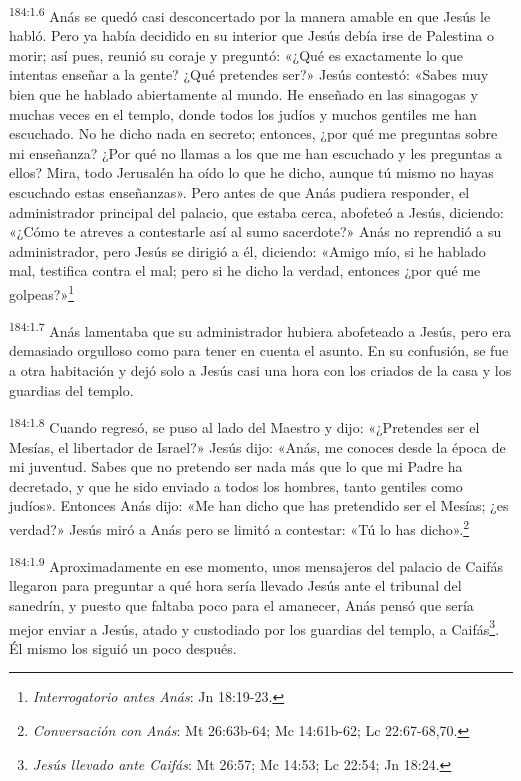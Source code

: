 \par 
\textsuperscript{184:1.6} Anás se quedó casi desconcertado por la manera amable en que Jesús le habló. Pero ya había decidido en su interior que Jesús debía irse de Palestina o morir; así pues, reunió su coraje y preguntó: «¿Qué es exactamente lo que intentas enseñar a la gente? ¿Qué pretendes ser?» Jesús contestó: «Sabes muy bien que he hablado abiertamente al mundo. He enseñado en las sinagogas y muchas veces en el templo, donde todos los judíos y muchos gentiles me han escuchado. No he dicho nada en secreto; entonces, ¿por qué me preguntas sobre mi enseñanza? ¿Por qué no llamas a los que me han escuchado y les preguntas a ellos? Mira, todo Jerusalén ha oído lo que he dicho, aunque tú mismo no hayas escuchado estas enseñanzas». Pero antes de que Anás pudiera responder, el administrador principal del palacio, que estaba cerca, abofeteó a Jesús, diciendo: «¿Cómo te atreves a contestarle así al sumo sacerdote?» Anás no reprendió a su administrador, pero Jesús se dirigió a él, diciendo: «Amigo mío, si he hablado mal, testifica contra el mal; pero si he dicho la verdad, entonces ¿por qué me golpeas?»\footnote{\textit{Interrogatorio antes Anás}: Jn 18:19-23.}

\par 
\textsuperscript{184:1.7} Anás lamentaba que su administrador hubiera abofeteado a Jesús, pero era demasiado orgulloso como para tener en cuenta el asunto. En su confusión, se fue a otra habitación y dejó solo a Jesús casi una hora con los criados de la casa y los guardias del templo.

\par 
\textsuperscript{184:1.8} Cuando regresó, se puso al lado del Maestro y dijo: «¿Pretendes ser el Mesías, el libertador de Israel?» Jesús dijo: «Anás, me conoces desde la época de mi juventud. Sabes que no pretendo ser nada más que lo que mi Padre ha decretado, y que he sido enviado a todos los hombres, tanto gentiles como judíos». Entonces Anás dijo: «Me han dicho que has pretendido ser el Mesías; ¿es verdad?» Jesús miró a Anás pero se limitó a contestar: «Tú lo has dicho».\footnote{\textit{Conversación con Anás}: Mt 26:63b-64; Mc 14:61b-62; Lc 22:67-68,70.}

\par 
\textsuperscript{184:1.9} Aproximadamente en ese momento, unos mensajeros del palacio de Caifás llegaron para preguntar a qué hora sería llevado Jesús ante el tribunal del sanedrín, y puesto que faltaba poco para el amanecer, Anás pensó que sería mejor enviar a Jesús, atado y custodiado por los guardias del templo, a Caifás\footnote{\textit{Jesús llevado ante Caifás}: Mt 26:57; Mc 14:53; Lc 22:54; Jn 18:24.}. Él mismo los siguió un poco después.

